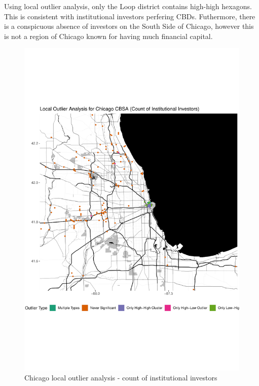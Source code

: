 Using local outlier analysis, only the Loop district contains high-high hexagons. This is consistent with institutional investors perfering CBDs.  Futhermore, there is a conspicuous absence of investors on the South Side of Chicago, however this is not a region of Chicago known for having much financial capital.  
\begin{figure}
	\centering
	\includegraphics[width=1\linewidth]{Figures/ChapterIV/Chi_Count_LO}
	\caption[Chicago CBSA Local Outlier Analysis - Count of Institutional Investors 1999-2018]{Chicago local outlier analysis - count of institutional investors}
	\label{fig:Chicagocountlocaloutliercount}
\end{figure}	

